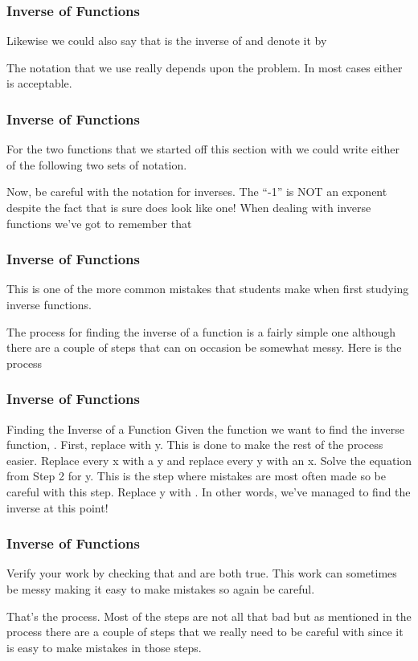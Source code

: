 \documentclass{beamer}
\begin{document}
\begin{frame}[fragile]
	\frametitle{Inverse of Functions}
	\Large
Likewise we could also say that  is the inverse of  and denote it by



The notation that we use really depends upon the problem.  In most cases either is acceptable.
\end{frame}
\begin{frame}[fragile]
	\frametitle{Inverse of Functions}
	\Large
For the two functions that we started off this section with we could write either of the following two sets of notation.



Now, be careful with the notation for inverses.  The “-1” is NOT an exponent despite the fact that is sure does look like one!  When dealing with inverse functions we’ve got to remember that
\end{frame}
\begin{frame}[fragile]
	\frametitle{Inverse of Functions}
	\Large

This is one of the more common mistakes that students make when first studying inverse functions.

The process for finding the inverse of a function is a fairly simple one although there are a couple of steps that can on occasion be somewhat messy.  Here is the process
\end{frame}
\begin{frame}[fragile]
	\frametitle{Inverse of Functions}
	\Large
Finding the Inverse of a Function
Given the function  we want to find the inverse function, .
First, replace  with y.  This is done to make the rest of the process easier.
Replace every x with a y and replace every y with an x.
Solve the equation from Step 2 for y.  This is the step where mistakes are most often made so be careful with this step.
Replace y with .  In other words, we’ve managed to find the inverse at this point!

\end{frame}
\begin{frame}[fragile]
	\frametitle{Inverse of Functions}
	\Large
Verify your work by checking that  and  are both true.  This work can sometimes be messy making it easy to make mistakes so again be careful.

That’s the process.  Most of the steps are not all that bad but as mentioned in the process there are a couple of steps that we really need to be careful with since it is easy to make mistakes in those steps.
\end{frame}
\end{document}
